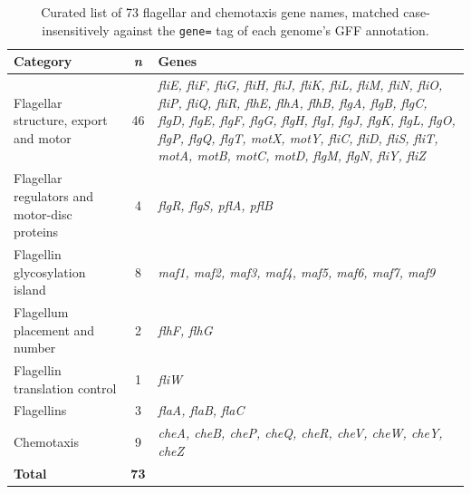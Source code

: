 \begin{table}[htbp]
\centering
\caption{Curated list of 73 flagellar and chemotaxis gene names, matched case-insensitively against the \texttt{gene=} tag of each genome's GFF annotation.}
\label{tab:curated_genes}
\small
\begin{tabularx}{\textwidth}{@{}p{4.6cm}cX@{}}
\toprule
\textbf{Category} & \textbf{\textit{n}} & \textbf{Genes} \\
\midrule
Flagellar structure, export and motor & 46 &
\textit{fliE, fliF, fliG, fliH, fliJ, fliK, fliL, fliM, fliN, fliO, fliP, fliQ, fliR, flhE, flhA, flhB, flgA, flgB, flgC, flgD, flgE, flgF, flgG, flgH, flgI, flgJ, flgK, flgL, flgO, flgP, flgQ, flgT, motX, motY, fliC, fliD, fliS, fliT, motA, motB, motC, motD, flgM, flgN, fliY, fliZ} \\
\addlinespace
Flagellar regulators and motor-disc proteins & 4 &
\textit{flgR, flgS, pflA, pflB} \\
\addlinespace
Flagellin glycosylation island & 8 &
\textit{maf1, maf2, maf3, maf4, maf5, maf6, maf7, maf9} \\
\addlinespace
Flagellum placement and number & 2 &
\textit{flhF, flhG} \\
\addlinespace
Flagellin translation control & 1 &
\textit{fliW} \\
\addlinespace
Flagellins & 3 &
\textit{flaA, flaB, flaC} \\
\addlinespace
Chemotaxis & 9 &
\textit{cheA, cheB, cheP, cheQ, cheR, cheV, cheW, cheY, cheZ} \\
\midrule
\textbf{Total} & \textbf{73} & \\
\bottomrule
\end{tabularx}
\end{table}
